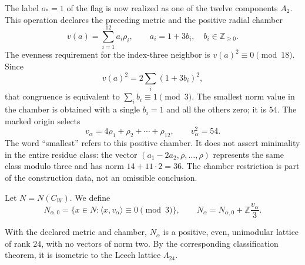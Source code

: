 

The label $o_*=1$ of the flag is now realized as one of the
twelve components $A_2$. This operation declares the preceding metric and
the positive radial chamber
\[
 v(a)=\sum_{i=1}^{12}a_i\rho_i,
 \qquad a_i=1+3b_i,\quad b_i\in\mathbb Z_{\geq0}.
\]
The evenness requirement for the index-three neighbor is
$v(a)^2\equiv0\pmod{18}$. Since
\[
 v(a)^2=2\sum_i(1+3b_i)^2,
\]
that congruence is equivalent to $\sum_i b_i\equiv1\pmod3$. The smallest
norm value in the chamber is obtained with a single $b_i=1$ and
all the others zero; it is $54$. The marked origin selects
\begin{equation}
 v_\alpha=4\rho_1+\rho_2+\cdots+\rho_{12},
 \qquad v_\alpha^2=54.
 \label{x_reciprocidad:exc:vector}
\end{equation}
The word ``smallest'' refers to this positive chamber. It does not assert
minimality in the entire residue class: the vector
$(a_1-2a_2,\rho,\ldots,\rho)$ represents the same class modulo three
and has norm $14+11\cdot2=36$. The chamber restriction is part
of the construction data, not an omissible conclusion.

Let $N=N(C_W)$. We define
\begin{equation}
 N_{\alpha,0}=\{x\in N:\langle x,v_\alpha\rangle\equiv0\pmod3\},
 \qquad
 N_\alpha=N_{\alpha,0}+\mathbb Z\frac{v_\alpha}{3}.
 \label{x_reciprocidad:exc:vecino}
\end{equation}

\begin{theorem}
\label{x_reciprocidad:exc:teorema-leech}
With the declared metric and chamber, $N_\alpha$ is a positive, even,
unimodular lattice of rank $24$, with no vectors of norm two.
By the corresponding classification theorem, it is isometric to the
Leech lattice $\Lambda_{24}$.
\end{theorem}

